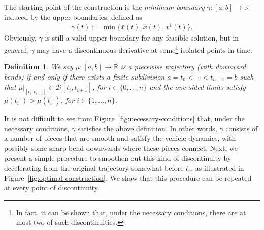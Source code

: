 \documentclass[a4paper]{article}
\theoremstyle{definition}
\theoremstyle{plain}
\newtheorem{define}{Definition\hspace{0.25em}\ignorespaces}
\begin{document}
The starting point of the construction is the \emph{minimum boundary}
$\gamma : [a,b] \rightarrow \mathbb{R}$ induced by the upper boundaries, defined as
\begin{align}\label{eq:min-boundary}
  \gamma(t) := \min \{ \bar{x}(t), \hat{x}(t), x^{1}(t) \} .
\end{align}
%
Obviously, $\gamma$ is still a valid upper boundary for any feasible solution,
%
but in general, $\gamma$ may have a discontinuous derivative at some\footnote{In fact, it can be shown that, under the necessary conditions, there are at most two of such discontinuities.} isolated
points in time.

\begin{define}\label{def:piecewise-trajectory}
  We say $\mu : [a, b] \rightarrow \mathbb{R}$ is a \emph{piecewise trajectory
    (with downward bends)} if and only if there exists a finite subdivision
  $a = t_{0} < \cdots < t_{n+1} = b$ such that
  $\mu|_{[t_{i}, t_{i+1}]} \in \mathcal{D}[t_{i}, t_{i+1}]$, for
  $i \in \{0, \dots, n\}$ and the one-sided limits satisfy
  $\dot{\mu}(t_{i}^{-}) > \dot{\mu}(t_{i}^{+})$, for $i \in \{1, \dots, n\}$.
\end{define}

It is not difficult to see from Figure~\ref{fig:necessary-conditions} that,
under the necessary conditions, $\gamma$ satisfies the above definition. In
other words, $\gamma$ consists of a number of pieces that are smooth and satisfy
the vehicle dynamics, with possibly some sharp bend downwards where these pieces
connect.
%
Next, we present a simple procedure to smoothen out this kind of discontinuity
by decelerating from the original trajectory somewhat before $t_{c}$, as
illustrated in Figure~\ref{fig:optimal-construction}. We show that this
procedure can be repeated at every point of discontinuity.
\end{document}
